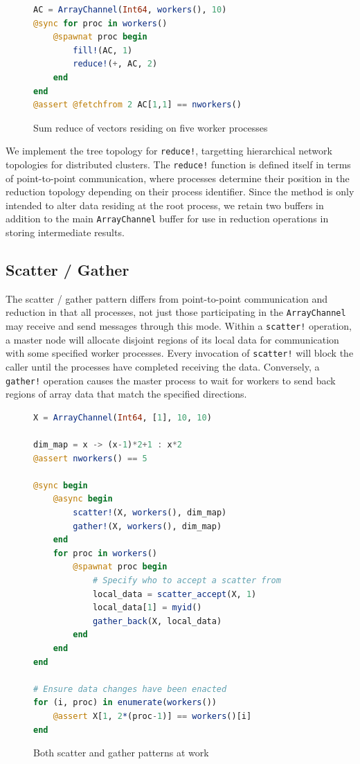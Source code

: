 \documentclass{juliacon}
\begin{document}
\begin{figure}[htb]
	\begin{lstlisting}[language=Julia]
AC = ArrayChannel(Int64, workers(), 10)
@sync for proc in workers()
	@spawnat proc begin
		fill!(AC, 1)
		reduce!(+, AC, 2)
	end
end
@assert @fetchfrom 2 AC[1,1] == nworkers()
	\end{lstlisting}
	\caption{Sum reduce of vectors residing on five worker processes}
	\label{code:reduce}
\end{figure}

We implement the tree topology for \texttt{reduce!}, targetting
hierarchical network topologies for distributed clusters. The
\texttt{reduce!} function is defined itself in terms of point-to-point
communication, where processes determine their position in the reduction
topology depending on their process identifier. Since the method is only
intended to alter data residing at the root process, we retain two
buffers in addition to the main \texttt{ArrayChannel} buffer for use in
reduction operations in storing intermediate results.

\subsection{Scatter / Gather}
\label{sec:scatter-gather}

The scatter / gather pattern differs from point-to-point communication and reduction in that all processes, not just those participating in the \texttt{ArrayChannel} may receive and send messages through this mode. Within a \texttt{scatter!} operation, a master node will allocate disjoint regions of its local data for communication with some specified worker processes. Every invocation of \texttt{scatter!} will block the caller until the processes have completed receiving the data. Conversely, a \texttt{gather!} operation causes the master process to wait for workers to send back regions of array data that match the specified directions.

\begin{figure}[htb]
	\begin{lstlisting}[language=Julia]
X = ArrayChannel(Int64, [1], 10, 10)

dim_map = x -> (x-1)*2+1 : x*2
@assert nworkers() == 5

@sync begin
	@async begin
		scatter!(X, workers(), dim_map)
		gather!(X, workers(), dim_map)
	end
	for proc in workers()
		@spawnat proc begin
			# Specify who to accept a scatter from
			local_data = scatter_accept(X, 1)
			local_data[1] = myid()
			gather_back(X, local_data)
		end
	end
end

# Ensure data changes have been enacted
for (i, proc) in enumerate(workers())
	@assert X[1, 2*(proc-1)] == workers()[i]
end
	\end{lstlisting}
	\caption{Both scatter and gather patterns at work}
	\label{code:scatter-gather}
\end{figure}
\end{document}
